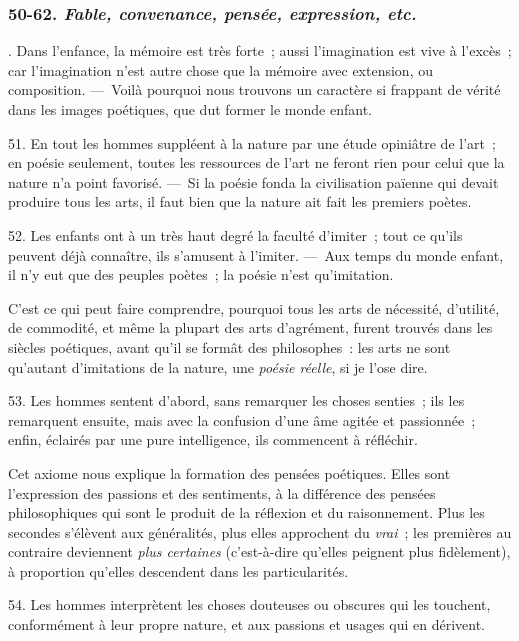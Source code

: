 \documentclass[french,twoside]{book} %
\begin{document}
\subsubsection[{50-62. Fable, convenance, pensée, expression, etc.}]{ \textsc{50-62. } {\itshape Fable, convenance, pensée, expression, etc.} }
. Dans l’enfance, la mémoire est très forte ; aussi l’imagination est vive à l’excès ; car l’imagination n’est autre chose que la mémoire avec extension, ou composition. — Voilà pourquoi nous trouvons un caractère si frappant de vérité dans les images poétiques, que dut former le monde enfant.\par
51. En tout les hommes suppléent à la nature par une étude opiniâtre de l’art ; en poésie seulement, toutes les ressources de l’art ne feront rien pour celui que la nature n’a point favorisé. — Si la poésie fonda la civilisation païenne qui devait produire tous les arts, il faut bien que la nature ait fait les premiers poètes.\par
52. Les enfants ont à un très haut degré la faculté d’imiter ; tout ce qu’ils peuvent déjà connaître, ils s’amusent à l’imiter. — Aux temps du monde enfant, il n’y eut que des peuples poètes ; la poésie n’est qu’imitation.\par
C’est ce qui peut faire comprendre, pourquoi tous les arts de nécessité, d’utilité, de commodité, et même la plupart des arts d’agrément, furent trouvés dans les siècles poétiques, avant qu’il se formât des philosophes : les arts ne sont qu’autant d’imitations de la nature, une {\itshape poésie réelle}, si je l’ose dire.\par
\par
 53. Les hommes sentent d’abord, sans remarquer les choses senties ; ils les remarquent ensuite, mais avec la confusion d’une âme agitée et passionnée ; enfin, éclairés par une pure intelligence, ils commencent à réfléchir.\par
Cet axiome nous explique la formation des pensées poétiques. Elles sont l’expression des passions et des sentiments, à la différence des pensées philosophiques qui sont le produit de la réflexion et du raisonnement. Plus les secondes s’élèvent aux généralités, plus elles approchent du {\itshape vrai} ; les premières au contraire deviennent {\itshape plus certaines} (c’est-à-dire qu’elles peignent plus fidèlement), à proportion qu’elles descendent dans les particularités.\par
54. Les hommes interprètent les choses douteuses ou obscures qui les touchent, conformément à leur propre nature, et aux passions et usages qui en dérivent.\par
\end{document}
